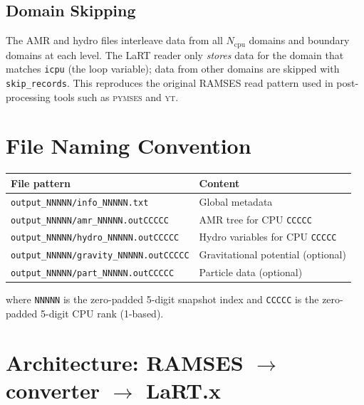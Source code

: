 \documentclass[english,a4paper]{my_memo}
\begin{document}
\subsection{Domain Skipping}

The AMR and hydro files interleave data from all $N_\mathrm{cpu}$ domains
and boundary domains at each level.  The LaRT reader only \emph{stores} data
for the domain that matches \texttt{icpu} (the loop variable); data from
other domains are skipped with \texttt{skip\_records}.  This reproduces the
original RAMSES read pattern used in post-processing tools such as
\textsc{pymses} and \textsc{yt}.

\section{File Naming Convention}

\begin{center}
\begin{tabular}{ll}
\toprule
File pattern & Content \\
\midrule
\texttt{output\_NNNNN/info\_NNNNN.txt}         & Global metadata \\
\texttt{output\_NNNNN/amr\_NNNNN.outCCCCC}     & AMR tree for CPU \texttt{CCCCC}\\
\texttt{output\_NNNNN/hydro\_NNNNN.outCCCCC}   & Hydro variables for CPU \texttt{CCCCC}\\
\texttt{output\_NNNNN/gravity\_NNNNN.outCCCCC} & Gravitational potential (optional)\\
\texttt{output\_NNNNN/part\_NNNNN.outCCCCC}    & Particle data (optional)\\
\bottomrule
\end{tabular}
\end{center}

where \texttt{NNNNN} is the zero-padded 5-digit snapshot index and
\texttt{CCCCC} is the zero-padded 5-digit CPU rank (1-based).

\section{Architecture: RAMSES $\rightarrow$ converter $\rightarrow$ LaRT.x}
\end{document}

